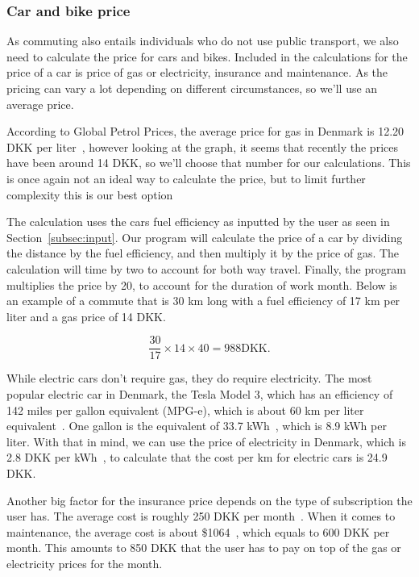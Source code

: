 \subsubsection{Car and bike price}

As commuting also entails individuals who do not use public transport, we also need to calculate the price for cars
and bikes.
Included in the calculations for the price of a car is price of gas or electricity, insurance and maintenance.
As the pricing can vary a lot depending on different circumstances, so we'll use an average price.

According to Global Petrol Prices, the average price for gas in Denmark is 12.20 DKK per liter~\cite{price_gas}, however
looking at the graph, it seems that recently the prices have been around 14 DKK, so we'll choose that number for our
calculations.
This is once again not an ideal way to calculate the price, but to limit further complexity this is our best option

The calculation uses the cars fuel efficiency as inputted by the user as seen in Section~\ref{subsec:input}.
Our program will calculate the price of a car by dividing the distance by the fuel efficiency, and then multiply it by
the price of gas.
The calculation will time by two to account for both way travel.
Finally, the program multiplies the price by 20, to account for the duration of work month.
Below is an example of a commute that is 30 km long with a fuel efficiency of 17 km per liter and a gas price of 14 DKK.

\begin{equation}
    \frac{30}{17} \times 14 \times 40 = 988 \text{DKK}.
\end{equation}

While electric cars don't require gas, they do require electricity.
The most popular electric car in Denmark, the Tesla Model 3, which has an efficiency of 142 miles per gallon equivalent
(MPG-e), which is about 60 km per liter equivalent~\cite{price_el}.
One gallon is the equivalent of 33.7 kWh~\cite{price_mpge}, which is 8.9 kWh per liter.
With that in mind, we can use the price of electricity in Denmark, which is 2.8 DKK per kWh~\cite{price_energy}, to
calculate that the cost per km for electric cars is 24.9 DKK.

Another big factor for the insurance price depends on the type of subscription the user has.
The average cost is roughly 250 DKK per month~\cite{price_insurance}.
When it comes to maintenance, the average cost is about \$1064~\cite{price_repair}, which equals to 600 DKK per month.
This amounts to 850 DKK that the user has to pay on top of the gas or electricity prices for the month.

